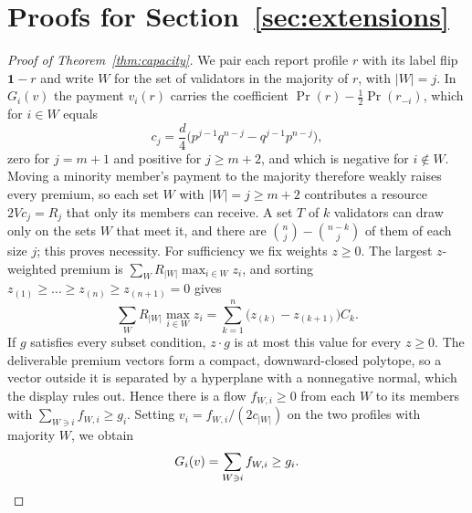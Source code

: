 \documentclass[sigconf,anonymous,review]{acmart}
\numberwithin{equation}{section}
\begin{document}
\section{Proofs for Section~\ref{sec:extensions}}
\label{app:extensions}

\begin{proof}[Proof of Theorem~\ref{thm:capacity}]
We pair each report profile $r$ with its label flip $\mathbf1-r$ and write $W$
for the set of validators in the majority of $r$, with $|W|=j$. In $G_i(v)$ the
payment $v_i(r)$ carries the coefficient $\Pr(r)-\frac12\Pr(r_{-i})$, which for
$i\in W$ equals
\[
c_j=\frac d4\bigl(p^{j-1}q^{n-j}-q^{j-1}p^{n-j}\bigr),
\]
zero for $j=m+1$ and positive for $j\ge m+2$, and which is negative for
$i\notin W$. Moving a minority member's payment to the majority therefore
weakly raises every premium, so each set $W$ with $|W|=j\ge m+2$ contributes a
resource $2Vc_j=R_j$ that only its members can receive. A set $T$ of $k$
validators can draw only on the sets $W$ that meet it, and there are
$\binom nj-\binom{n-k}{j}$ of them of each size $j$; this proves necessity. For
sufficiency we fix weights $z\ge0$. The largest $z$-weighted premium is
$\sum_WR_{|W|}\max_{i\in W}z_i$, and sorting
$z_{(1)}\ge\dots\ge z_{(n)}\ge z_{(n+1)}=0$ gives
\[
\sum_WR_{|W|}\max_{i\in W}z_i=\sum_{k=1}^{n}\bigl(z_{(k)}-z_{(k+1)}\bigr)C_k .
\]
If $g$ satisfies every subset condition, $z\cdot g$ is at most this value for
every $z\ge0$. The deliverable premium vectors form a compact, downward-closed
polytope, so a vector outside it is separated by a hyperplane with a
nonnegative normal, which the display rules out. Hence there is a flow
$f_{W,i}\ge0$ from each $W$ to its members with $\sum_{W\ni i}f_{W,i}\ge g_i$.
Setting $v_i=f_{W,i}/(2c_{|W|})$ on the two profiles with majority $W$, we obtain
\[
G_i(v)=\sum_{W\ni i}f_{W,i}\ge g_i .\qedhere
\]
\end{proof}
\end{document}
